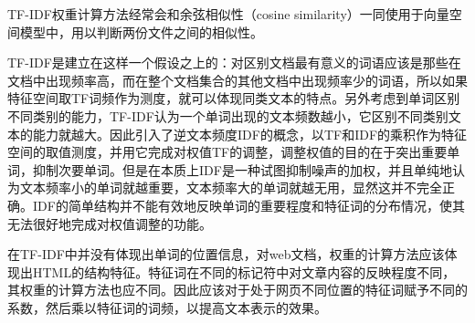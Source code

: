 \par TF-IDF权重计算方法经常会和余弦相似性（cosine similarity）一同使用于向量空间模型中，用以判断两份文件之间的相似性。
\par TF-IDF是建立在这样一个假设之上的：对区别文档最有意义的词语应该是那些在文档中出现频率高，而在整个文档集合的其他文档中出现频率少的词语，所以如果特征空间取TF词频作为测度，就可以体现同类文本的特点。另外考虑到单词区别不同类别的能力，TF-IDF认为一个单词出现的文本频数越小，它区别不同类别文本的能力就越大。因此引入了逆文本频度IDF的概念，以TF和IDF的乘积作为特征空间的取值测度，并用它完成对权值TF的调整，调整权值的目的在于突出重要单词，抑制次要单词。但是在本质上IDF是一种试图抑制噪声的加权，并且单纯地认为文本频率小的单词就越重要，文本频率大的单词就越无用，显然这并不完全正确。IDF的简单结构并不能有效地反映单词的重要程度和特征词的分布情况，使其无法很好地完成对权值调整的功能。
\par 在TF-IDF中并没有体现出单词的位置信息，对web文档，权重的计算方法应该体现出HTML的结构特征。特征词在不同的标记符中对文章内容的反映程度不同，其权重的计算方法也应不同。因此应该对于处于网页不同位置的特征词赋予不同的系数，然后乘以特征词的词频，以提高文本表示的效果。




